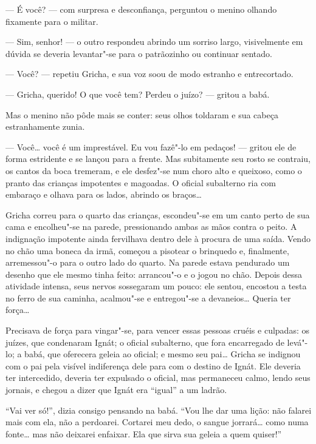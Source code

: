 --- É você? --- com surpresa e desconfiança, perguntou o menino olhando
fixamente para o militar.

--- Sim, senhor! --- o outro respondeu abrindo um sorriso largo,
visivelmente em dúvida se deveria levantar"-se para o patrãozinho ou
continuar sentado.

--- Você? --- repetiu Gricha, e sua voz soou de modo estranho e
entrecortado.

--- Gricha, querido! O que você tem? Perdeu o juízo? --- gritou a babá.

Mas o menino não pôde mais se conter: seus olhos toldaram e sua cabeça
estranhamente zunia.

--- Você\ldots{} você é um imprestável. Eu vou fazê"-lo em pedaços! --- gritou
ele de forma estridente e se lançou para a frente. Mas subitamente seu
rosto se contraiu, os cantos da boca tremeram, e ele desfez"-se num choro
alto e queixoso, como o pranto das crianças impotentes e magoadas. O oficial
subalterno ria com embaraço e olhava para os lados, abrindo os braços\ldots{}

Gricha correu para o quarto das crianças, escondeu"-se em um canto perto
de sua cama e encolheu"-se na parede, pressionando ambas as mãos contra o
peito. A indignação impotente ainda fervilhava dentro dele à procura de
uma saída. Vendo no chão uma boneca da irmã, começou a pisotear o
brinquedo e, finalmente, arremessou"-o para o outro lado do quarto. Na
parede estava pendurado um desenho que ele mesmo tinha feito: arrancou"-o
e o jogou no chão. Depois dessa atividade intensa, seus nervos
sossegaram um pouco: ele sentou, encostou a testa no ferro de sua
caminha, acalmou"-se e entregou"-se a devaneios\ldots{} Queria ter força\ldots{}

Precisava de força para vingar"-se, para vencer essas pessoas cruéis e
culpadas: os juízes, que condenaram Ignát; o oficial subalterno, que
fora encarregado de levá"-lo; a babá, que oferecera geleia ao oficial; e
mesmo seu pai\ldots{} Gricha se indignou com o pai pela visível indiferença
dele para com o destino de Ignát. Ele deveria ter intercedido, deveria
ter expulsado o oficial, mas permaneceu calmo, lendo seus jornais, e
chegou a dizer que Ignát era ``igual'' a um ladrão.

``Vai ver só!'', dizia consigo pensando na babá. ``Vou lhe dar uma
lição: não falarei mais com ela, não a perdoarei. Cortarei meu dedo, o
sangue jorrará\ldots{} como numa fonte\ldots{} mas não deixarei enfaixar. Ela que
sirva sua geleia a quem quiser!''

